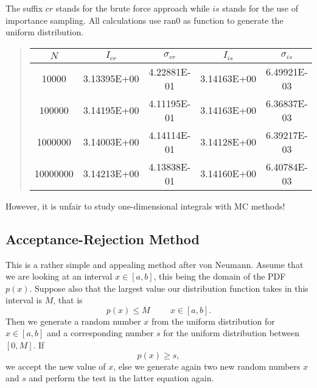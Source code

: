 \documentclass[%
oneside,                 %
final,                   %
10pt]{article}
\newenvironment{block_mdfboxadmon}[1][]{
\begin{block_mdfboxmdframed}[frametitle=#1]
}
{
\end{block_mdfboxmdframed}
}
\begin{document}
\begin{block_mdfboxadmon}[]
The suffix $cr$ stands for the brute force approach 
while $is$ stands for the use of importance sampling.
All calculations use ran0 as function to generate the uniform distribution.


\begin{quote}
\begin{tabular}{ccccc}
\hline
\multicolumn{1}{c}{ $N$ } & \multicolumn{1}{c}{ $I_{cr}$ } & \multicolumn{1}{c}{ $\sigma_{cr}$ } & \multicolumn{1}{c}{ $I_{is}$ } & \multicolumn{1}{c}{ $\sigma_{is}$ } \\
\hline
10000    & 3.13395E+00 & 4.22881E-01   & 3.14163E+00 & 6.49921E-03   \\
100000   & 3.14195E+00 & 4.11195E-01   & 3.14163E+00 & 6.36837E-03   \\
1000000  & 3.14003E+00 & 4.14114E-01   & 3.14128E+00 & 6.39217E-03   \\
10000000 & 3.14213E+00 & 4.13838E-01   & 3.14160E+00 & 6.40784E-03   \\
\hline
\end{tabular}
\end{quote}

\noindent
However, it is unfair to study one-dimensional integrals with MC methods!
\end{block_mdfboxadmon} %







\subsection{Acceptance-Rejection Method}

\begin{block_mdfboxadmon}[]
This is a rather simple and appealing
method after von Neumann. Assume that we are looking at an interval
$x\in [a,b]$, this being the domain of the PDF $p(x)$. Suppose also that
the largest value our distribution function takes in this interval
is $M$, that is
\begin{equation*}
    p(x) \le M \hspace{1cm}  x\in [a,b].
\end{equation*}
Then we generate a random number $x$ from the uniform distribution
for $x\in [a,b]$ and a corresponding number $s$ for the uniform
distribution between $[0,M]$. If
\begin{equation*}
p(x) \ge s,
\end{equation*}
we accept the new value of $x$, else we generate
again two new random numbers $x$ and $s$ and perform the test
in the latter equation again.
\end{block_mdfboxadmon} %
\end{document}
